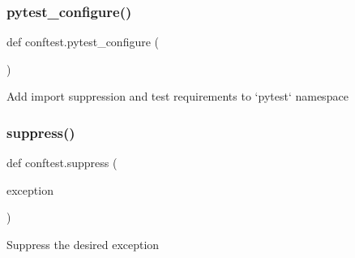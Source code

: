 \subsubsection{\texorpdfstring{pytest\_configure()}{pytest\_configure()}}
{\footnotesize\ttfamily def conftest.\+pytest\+\_\+configure (\begin{DoxyParamCaption}{ }\end{DoxyParamCaption})}

\begin{DoxyVerb}Add import suppression and test requirements to `pytest` namespace\end{DoxyVerb}
 \mbox{\label{namespaceconftest_a91c661a91528bcb9b6c5f6acbc7f6558}} 
\subsubsection{\texorpdfstring{suppress()}{suppress()}}
{\footnotesize\ttfamily def conftest.\+suppress (\begin{DoxyParamCaption}\item[{}]{exception }\end{DoxyParamCaption})}

\begin{DoxyVerb}Suppress the desired exception\end{DoxyVerb}
 